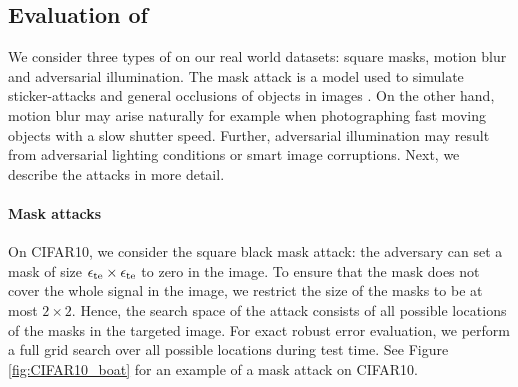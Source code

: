 \subsection{Evaluation of \nameofattacks}

We consider three types of \nameofattacks on our real world datasets:
square masks, motion blur and adversarial illumination. The mask
attack is a model used to simulate sticker-attacks and general
occlusions of objects in images \cite{Eykholt18, Wu20}. On the other
hand, motion blur may arise naturally for example when photographing
fast moving objects with a slow shutter speed. Further, adversarial
illumination may result from adversarial lighting conditions or smart
image corruptions. Next, we describe the attacks in more detail.

\paragraph{Mask attacks}
On CIFAR10, we consider the square black mask attack: the adversary can set a mask
of size $\epsilon_{\text{te}} \times \epsilon_{\text{te}}$ to zero in the image. To ensure that the mask does not cover the whole signal in the image, we
restrict the size of the masks to be at most $2 \times 2$. Hence, the search space of the attack consists of all possible locations of the masks in the targeted image. For exact robust error evaluation, we perform a full grid search over all possible locations during test time. See Figure \ref{fig:CIFAR10_boat} for an example of a mask attack on CIFAR10.

